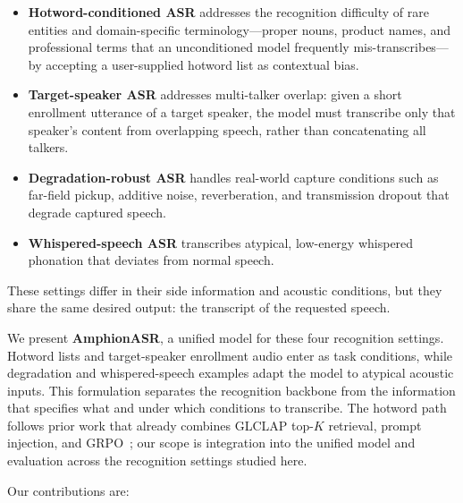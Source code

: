 \begin{itemize}
  \item \textbf{Hotword-conditioned ASR} addresses the recognition
        difficulty of rare entities and domain-specific
        terminology---proper nouns, product names, and professional
        terms that an unconditioned model frequently
        mis-transcribes---by accepting a user-supplied hotword list as
        contextual bias.
  \item \textbf{Target-speaker ASR} addresses multi-talker overlap:
        given a short enrollment utterance of a target speaker, the
        model must transcribe only that speaker's content from
        overlapping speech, rather than concatenating all talkers.
  \item \textbf{Degradation-robust ASR} handles real-world capture
        conditions such as far-field pickup, additive noise,
        reverberation, and transmission dropout that degrade captured
        speech.
  \item \textbf{Whispered-speech ASR} transcribes atypical, low-energy
        whispered phonation that deviates from normal speech.
\end{itemize}

These settings differ in their side information and acoustic
conditions, but they share the same desired output: the transcript of
the requested speech.

We present \textbf{AmphionASR}, a unified model for these four
recognition settings.
Hotword lists and target-speaker enrollment audio enter as task
conditions, while degradation and whispered-speech examples adapt the
model to atypical acoustic inputs.
This formulation separates the recognition backbone from the
information that specifies what and under which conditions to
transcribe.
The hotword path follows prior work that already combines GLCLAP
top-$K$ retrieval, prompt injection, and GRPO~\cite{lakomkin2025contextual};
our scope is integration into the unified model and evaluation across
the recognition settings studied here.

Our contributions are:

